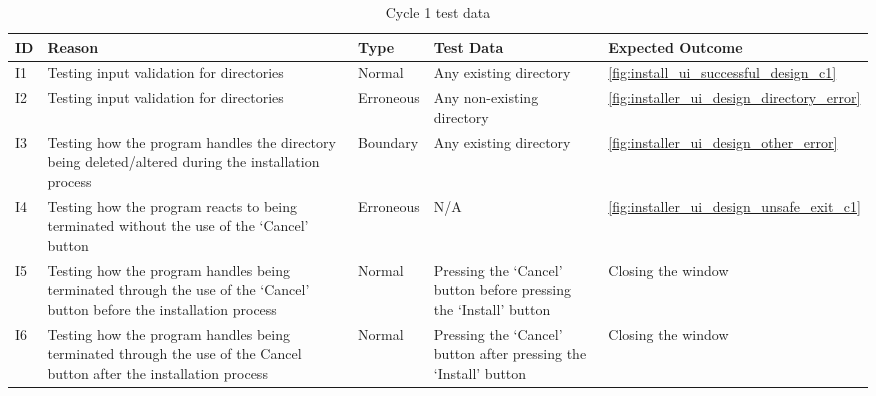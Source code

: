 \newpage
\begin{table}[!ht]
    \centering
    \begin{tabular}{@{}lp{}lp{}l@{}} \toprule
        \textbf{ID} & \textbf{Reason} & \textbf{Type} & \textbf{Test Data} & \textbf{Expected Outcome} \\ \midrule
        I1 & Testing input validation for directories & Normal & Any existing directory & \autoref{fig:install_ui_successful_design_c1} \\ 
        I2 & Testing input validation for directories & Erroneous & Any non-existing directory & \autoref{fig:installer_ui_design_directory_error} \\ 
        I3 & Testing how the program handles the directory being deleted/altered during the installation process & Boundary & Any existing directory & \autoref{fig:installer_ui_design_other_error} \\ 
        I4 & Testing how the program reacts to being terminated without the use of the `Cancel' button & Erroneous & N/A & \autoref{fig:installer_ui_design_unsafe_exit_c1} \\ 
        I5 & Testing how the program handles being terminated through the use of the `Cancel' button before the installation process & Normal & Pressing the `Cancel' button before pressing the `Install' button & Closing the window \\ 
        I6 & Testing how the program handles being terminated through the use of the Cancel button after the installation process & Normal & Pressing the `Cancel' button after pressing the `Install' button & Closing the window \\
        \bottomrule
    \end{tabular}
    \caption{Cycle 1 test data}
    \label{tbl:test_data_before_c1}
\end{table}

\newpage


